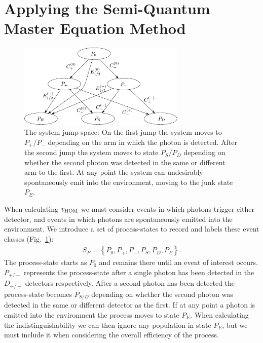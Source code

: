 \section{Applying the Semi-Quantum Master Equation Method}

\begin{figure}[htb]
  \begin{center}
  \includegraphics[width=8cm]{assets/subspace_partition.pdf}
\end{center}
  \caption{The system jump-space: On the first jump the system moves to $P_+ / P_-$ depending on the arm in which the photon is detected. After the second jump the system moves to state $P_S / P_D$ depending on whether the second photon was detected in the same or different arm to the first. At any point the system can undesirably spontaneously emit into the environment, moving to the junk state $P_E$.}
  \label{subspace_partition}
\end{figure}

When calculating $v_{\rm HOM}$ we must consider events in which photons trigger either detector, and events in which photons are spontaneously emitted into the environment. We introduce a set of process-states to record and labels these event classes (Fig.~\ref{subspace_partition}):
\begin{eqnarray}
  S_P = \left\{ P_0, P_+, P_-, P_S, P_D, P_E \right\}.
\end{eqnarray}
The process-state starts as $P_0$ and remains there until an event of interest occurs. $P_{+/-}$ represents the process-state after a single photon has been detected in the $D_{+/-}$ detectors respectively. After a second photon has been detected the process-state becomes $P_{S/D}$ depending on whether the second photon was detected in the same or different detector as the first. If at any point a photon is emitted into the environment the process moves to state $P_E$. When calculating the indistinguishability we can then ignore any population in state $P_E$, but we must include it when considering the overall efficiency of the process.

